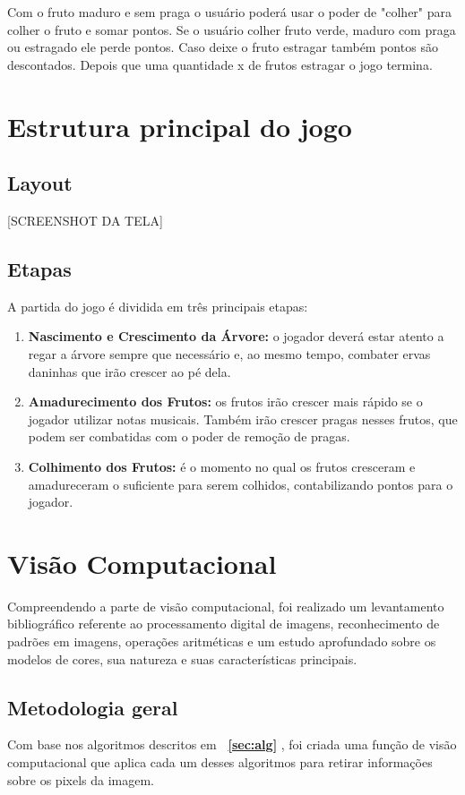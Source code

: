 \documentclass[12pt]{article}
\begin{document}
 Com o fruto maduro e sem praga o usu\'ario poder\'a usar o poder de  "colher" para  colher o fruto e somar pontos. 
 Se o usu\'ario colher fruto verde, maduro com praga ou estragado ele perde pontos.
 Caso deixe o fruto estragar tamb\'em pontos s\~ao descontados. Depois que uma quantidade x de frutos estragar
 o jogo termina.
 
\section{Estrutura principal do jogo}

\subsection{Layout}
[SCREENSHOT DA TELA]

\subsection{Etapas}
A partida do jogo \'e dividida em tr\^es principais etapas: 

\begin{enumerate}
\item \textbf{Nascimento e Crescimento da \'Arvore:} o jogador dever\'a estar atento a regar a \'arvore sempre que
necess\'ario e, ao mesmo tempo, combater ervas daninhas que ir\~ao crescer ao p\'e dela.
\item \textbf{Amadurecimento dos Frutos:} os frutos ir\~ao crescer mais r\'apido se o jogador utilizar notas musicais.
Tamb\'em ir\~ao crescer pragas nesses frutos, que podem ser combatidas com o poder de remo\c c\~ao de pragas.
\item \textbf{Colhimento dos Frutos:} \'e o momento no qual os frutos cresceram e amadureceram
 o suficiente para serem colhidos, contabilizando pontos para o jogador.
\end{enumerate}

\section{Vis\~ao Computacional}

Compreendendo a parte de vis\~ao computacional, foi realizado um levantamento bibliogr\'afico
referente ao processamento digital de imagens, reconhecimento de padr\~oes em imagens, opera\c c\~oes
aritm\'eticas e um estudo aprofundado sobre os modelos de cores, sua natureza e suas caracter\'isticas principais.

\subsection{Metodologia geral}
Com base nos algoritmos descritos em \textbf{~\ref{sec:alg}} , foi criada uma fun\c c\~ao de vis\~ao computacional que aplica cada um desses
algoritmos para retirar informa\c c\~oes sobre os pixels da imagem.
\end{document}
